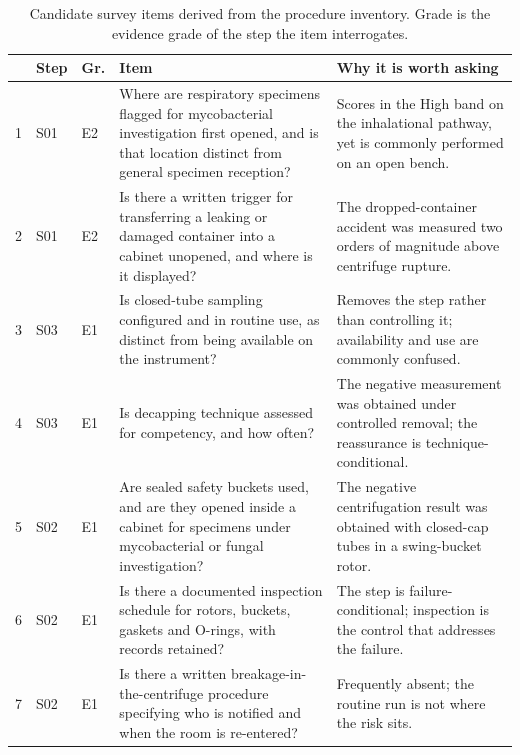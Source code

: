 \begin{table}[t]
\centering
\caption{Candidate survey items derived from the procedure inventory. Grade is
the evidence grade of the step the item interrogates.}
\label{tab:survey}
\small
\begin{tabular}{@{}p{} p{} p{} p{} p{}@{}}
\toprule
 & \textbf{Step} & \textbf{Gr.} & \textbf{Item} & \textbf{Why it is worth asking} \\
\midrule
1 & S01 & E2 & Where are respiratory specimens flagged for mycobacterial
investigation first opened, and is that location distinct from general
specimen reception? & Scores in the High band on the inhalational pathway, yet
is commonly performed on an open bench. \\

2 & S01 & E2 & Is there a written trigger for transferring a leaking or
damaged container into a cabinet unopened, and where is it displayed? & The
dropped-container accident was measured two orders of magnitude above
centrifuge rupture. \\

3 & S03 & E1 & Is closed-tube sampling configured and in routine use, as
distinct from being available on the instrument? & Removes the step rather
than controlling it; availability and use are commonly confused. \\

4 & S03 & E1 & Is decapping technique assessed for competency, and how
often? & The negative measurement was obtained under controlled removal; the
reassurance is technique-conditional. \\

5 & S02 & E1 & Are sealed safety buckets used, and are they opened inside a
cabinet for specimens under mycobacterial or fungal investigation? & The
negative centrifugation result was obtained with closed-cap tubes in a
swing-bucket rotor. \\

6 & S02 & E1 & Is there a documented inspection schedule for rotors, buckets,
gaskets and O-rings, with records retained? & The step is
failure-conditional; inspection is the control that addresses the failure. \\

7 & S02 & E1 & Is there a written breakage-in-the-centrifuge procedure
specifying who is notified and when the room is re-entered? & Frequently
absent; the routine run is not where the risk sits. \\


\end{tabular}
\end{table}
